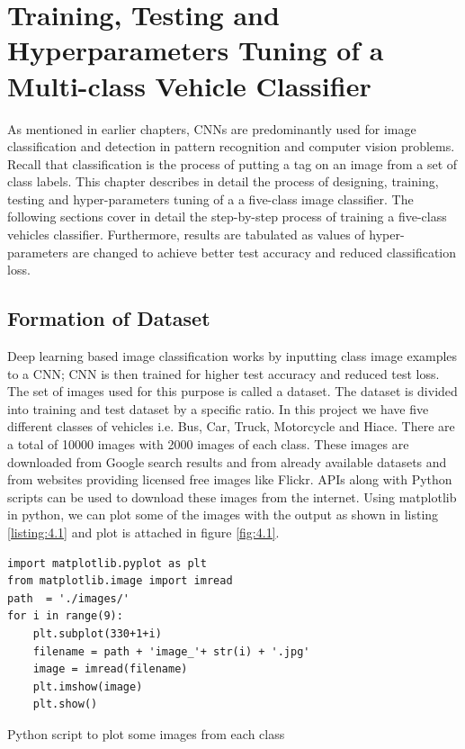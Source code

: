 \chapter{Training, Testing and Hyperparameters Tuning of a Multi-class
Vehicle Classifier}
\label{Chapter 4}
As mentioned in earlier chapters, CNNs are predominantly used for
image classification and detection in pattern recognition and
computer vision problems. Recall that classification is the process of putting a tag on
an image from a set of class labels. This chapter describes in detail
the process of designing, training, testing and hyper-parameters
tuning of a a five-class image classifier. The following sections
cover in detail the step-by-step process of training a five-class vehicles
classifier. Furthermore, results are tabulated as values of
hyper-parameters are changed to achieve better test accuracy and reduced
classification loss.
\section{Formation of Dataset}
Deep learning based image classification works by inputting class
image examples to a CNN; CNN is then trained for higher test accuracy
and reduced test loss. The set of images used for this purpose is
called a dataset.
The dataset is divided into training and test dataset by a specific ratio.
In this project we have five different classes of vehicles i.e. Bus, Car, Truck, Motorcycle
and Hiace. There are a total of 10000 images with 2000 images of each 
class. These images are downloaded from Google search results and from already available
datasets and from websites providing licensed free images like Flickr.
APIs along with Python
scripts can be used to download these images from the internet.
Using matplotlib in python, we can plot some of the images with the output as
shown in listing \ref{listing:4.1} and plot is attached in figure
\ref{fig:4.1}.
\linespread{1.0}
\begin{listing}[H]
\begin{verbatim}
import matplotlib.pyplot as plt
from matplotlib.image import imread  
path  = './images/'
for i in range(9):
    plt.subplot(330+1+i)
    filename = path + 'image_'+ str(i) + '.jpg'
    image = imread(filename)
    plt.imshow(image)    
    plt.show()
\end{verbatim}
\caption{Python script to plot some images from each class}
\label{listing:4.1}
\end{listing}

